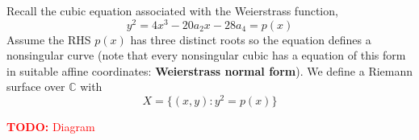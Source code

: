 \documentclass{article}
\newcommand{\mbb}[1]{\mathbb{#1}}
\newcommand{\TODO}[1]{\begin{center}\huge{\textcolor{red}{\textbf{TODO:} #1}}\end{center}}
\begin{document}
Recall the cubic equation associated with the Weierstrass function,
\begin{equation}y^2 = 4x^3 - 20a_2x - 28a_4 = p(x)\end{equation}
Assume the RHS \(p(x)\) has three distinct roots so the equation defines a nonsingular curve (note that every nonsingular cubic has a equation of this form in suitable affine coordinates: \textbf{Weierstrass normal form}). We define a Riemann surface over \(\mbb{C}\) with
\begin{equation}
  X = \{(x, y) : y^2 = p(x)\}
\end{equation}

\TODO{Diagram}
\end{document}
